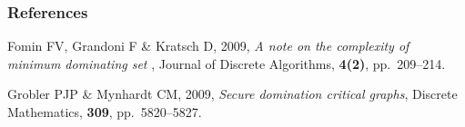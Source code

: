%
%

\begin{frame} \frametitle{References}
\begin{thebibliography}{xx}\footnotesize

 {\sc Fomin FV, Grandoni F \& Kratsch D}, 2009, {\em A note on the complexity of minimum dominating set }, Journal of Discrete Algorithms, {\bf{4(2)}}, pp.\ 209--214.

 {\sc Grobler PJP \& Mynhardt CM}, 2009, {\em Secure domination critical graphs}, Discrete Mathematics, {\bf 309}, pp.~5820--5827.


\end{thebibliography}
\end{frame}